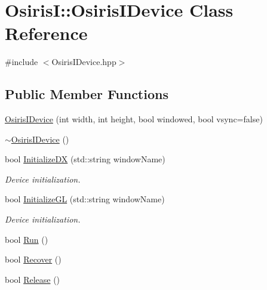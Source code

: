 \hypertarget{class_osiris_i_1_1_osiris_i_device}{\section{Osiris\-I\-:\-:Osiris\-I\-Device Class Reference}
\label{class_osiris_i_1_1_osiris_i_device}
}


{\ttfamily \#include $<$Osiris\-I\-Device.\-hpp$>$}

\subsection*{Public Member Functions}
\begin{DoxyCompactItemize}
\item 
\hyperlink{class_osiris_i_1_1_osiris_i_device_a6bcd20ff38a84f7879f30ebd35c8a1d2}{Osiris\-I\-Device} (int width, int height, bool windowed, bool vsync=false)
\item 
\hyperlink{class_osiris_i_1_1_osiris_i_device_ad02305e4715950067cdf48e5ed663438}{$\sim$\-Osiris\-I\-Device} ()
\item 
bool \hyperlink{class_osiris_i_1_1_osiris_i_device_a25e03c4add0f874313a913dc309f6dfa}{Initialize\-D\-X} (std\-::string window\-Name)
\begin{DoxyCompactList}\small\item\em Device initialization. \end{DoxyCompactList}\item 
bool \hyperlink{class_osiris_i_1_1_osiris_i_device_ab9565cbb43aa0074982d8dd43146b810}{Initialize\-G\-L} (std\-::string window\-Name)
\begin{DoxyCompactList}\small\item\em Device initialization. \end{DoxyCompactList}\item 
bool \hyperlink{class_osiris_i_1_1_osiris_i_device_ab7f5ac7e434f9990569a6cb9a6ffe5e1}{Run} ()
\item 
bool \hyperlink{class_osiris_i_1_1_osiris_i_device_a09d2281ec053825c90df5eb7781553f4}{Recover} ()
\item 
bool \hyperlink{class_osiris_i_1_1_osiris_i_device_aa11dcae6a143826df27de28d6d8db541}{Release} ()
\end{DoxyCompactItemize}


